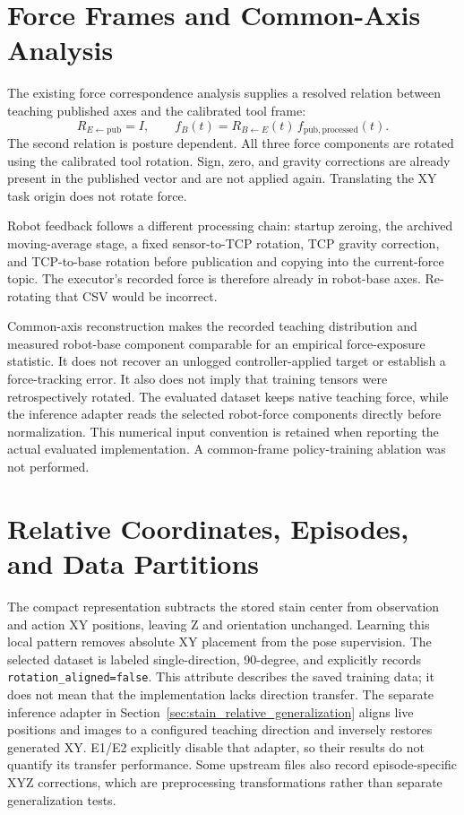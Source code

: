 \section{Force Frames and Common-Axis Analysis}
The existing force correspondence analysis supplies a resolved relation between teaching published axes and the calibrated tool frame:
\begin{equation}
 R_{E\leftarrow\mathrm{pub}}=I,\qquad
 f_B(t)=R_{B\leftarrow E}(t)\,f_{\mathrm{pub,processed}}(t).
 \label{eq:normal_force_projection}
\end{equation}
The second relation is posture dependent. All three force components are rotated using the calibrated tool rotation. Sign, zero, and gravity corrections are already present in the published vector and are not applied again. Translating the XY task origin does not rotate force.

Robot feedback follows a different processing chain: startup zeroing, the archived moving-average stage, a fixed sensor-to-TCP rotation, TCP gravity correction, and TCP-to-base rotation before publication and copying into the current-force topic. The executor's recorded force is therefore already in robot-base axes. Re-rotating that CSV would be incorrect.

Common-axis reconstruction makes the recorded teaching distribution and measured robot-base component comparable for an empirical force-exposure statistic. It does not recover an unlogged controller-applied target or establish a force-tracking error. It also does not imply that training tensors were retrospectively rotated. The evaluated dataset keeps native teaching force, while the inference adapter reads the selected robot-force components directly before normalization. This numerical input convention is retained when reporting the actual evaluated implementation. A common-frame policy-training ablation was not performed.

\section{Relative Coordinates, Episodes, and Data Partitions}
The compact representation subtracts the stored stain center from observation and action XY positions, leaving Z and orientation unchanged. Learning this local pattern removes absolute XY placement from the pose supervision. The selected dataset is labeled single-direction, 90-degree, and explicitly records \texttt{rotation\_aligned=false}. This attribute describes the saved training data; it does not mean that the implementation lacks direction transfer. The separate inference adapter in Section~\ref{sec:stain_relative_generalization} aligns live positions and images to a configured teaching direction and inversely restores generated XY. E1/E2 explicitly disable that adapter, so their results do not quantify its transfer performance. Some upstream files also record episode-specific XYZ corrections, which are preprocessing transformations rather than separate generalization tests.

